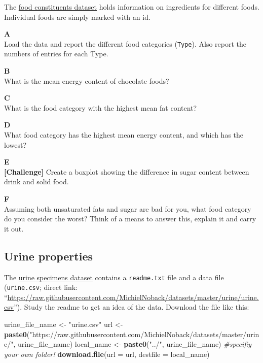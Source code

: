 \documentclass[]{book}
\newenvironment{Shaded}{\begin{snugshade}}{\end{snugshade}}
\newcommand{\CommentTok}[1]{\textcolor[rgb]{0.56,0.35,0.01}{\textit{#1}}}
\newcommand{\DataTypeTok}[1]{\textcolor[rgb]{0.13,0.29,0.53}{#1}}
\newcommand{\KeywordTok}[1]{\textcolor[rgb]{0.13,0.29,0.53}{\textbf{#1}}}
\newcommand{\NormalTok}[1]{#1}
\newcommand{\StringTok}[1]{\textcolor[rgb]{0.31,0.60,0.02}{#1}}
\begin{document}
The \href{https://raw.githubusercontent.com/MichielNoback/davur1_gitbook/master/data/food_constituents.txt}{food constituents dataset} holds information on ingredients for different foods. Individual foods are simply marked with an id.

\textbf{A}\\
Load the data and report the different food categories (\texttt{Type}). Also report the numbers of entries for each Type.

\textbf{B}\\
What is the mean energy content of chocolate foods?

\textbf{C}\\
What is the food category with the highest mean fat content?

\textbf{D}\\
What food category has the highest mean energy content, and which has the lowest?

\textbf{E}\\
\textbf{{[}Challenge{]}} Create a boxplot showing the difference in sugar content between drink and solid food.

\textbf{F}\\
Assuming both unsaturated fats and sugar are bad for you, what food category do you consider the worst? Think of a means to answer this, explain it and carry it out.

\hypertarget{urine-properties}{%
\subsection{Urine properties}\label{urine-properties}}

The \href{https://github.com/MichielNoback/datasets/tree/master/urine}{urine specimens dataset} contains a \texttt{readme.txt} file and a data file (\texttt{urine.csv}; direct link: ``\url{https://raw.githubusercontent.com/MichielNoback/datasets/master/urine/urine.csv}''). Study the readme to get an idea of the data. Download the file like this:

\begin{Shaded}
\begin{Highlighting}[]
\NormalTok{urine_file_name <-}\StringTok{ "urine.csv"}
\NormalTok{url <-}\StringTok{ }\KeywordTok{paste0}\NormalTok{(}\StringTok{"https://raw.githubusercontent.com/MichielNoback/datasets/master/urine/"}\NormalTok{, urine_file_name)}
\NormalTok{local_name <-}\StringTok{ }\KeywordTok{paste0}\NormalTok{(}\StringTok{"../"}\NormalTok{, urine_file_name) }\CommentTok{#specifiy your own folder!}
\KeywordTok{download.file}\NormalTok{(}\DataTypeTok{url =}\NormalTok{ url, }\DataTypeTok{destfile =}\NormalTok{ local_name)}
\end{Highlighting}
\end{Shaded}
\end{document}
